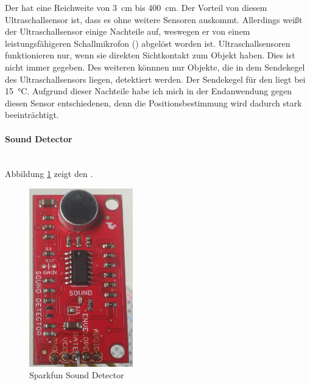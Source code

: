 Der \ultraschall \platz  hat eine Reichweite von \SI{3}{\centi \metre} bis \SI{400}{\centi \metre}. Der Vorteil von diesem Ultraschallsensor ist, dass es ohne weitere Sensoren auskommt. Allerdings weißt der Ultraschallsensor einige Nachteile auf, weswegen er von einem leistungsfähigeren Schallmikrofon (\microphone) abgelöst worden ist. Ultraschallsensoren funktionieren nur, wenn sie direkten Sichtkontakt zum Objekt haben. Dies ist nicht immer gegeben. Des weiteren könnnen nur Objekte, die in dem Sendekegel des Ultraschallsensors liegen, detektiert werden. Der Sendekegel für den \ultraschall \platz liegt bei \SI{15}{\degreeCelsius}. Aufgrund dieser Nachteile habe ich mich in der Endanwendung gegen diesen Sensor entschiedenen, denn die Positionsbestimmung wird dadurch stark beeinträchtigt.

\paragraph{Sound Detector}\mbox{}\\
Abbildung \ref{img:sound} zeigt den \microphone .

\begin{figure}[H]
        \centering
        \includegraphics[width=0.4\textwidth]{images/sounddetector.png}
        \caption{Sparkfun Sound Detector}
        \label{img:sound}
\end{figure}

